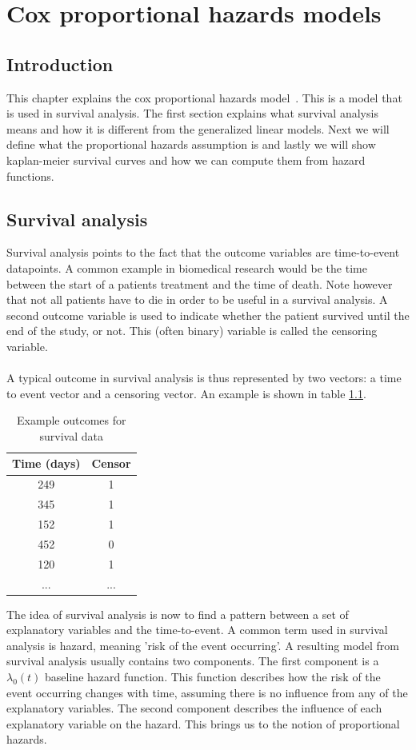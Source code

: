 \chapter{Cox proportional hazards models}
\label{cha:cox}

\section{Introduction}
\label{sec:cox-introduction}
This chapter explains the cox proportional hazards model~\cite{simon2011regularization}\cite{tibshirani1997lasso}\cite{wikicox}. This is a model that is used in survival analysis. The first section explains what survival analysis means and how it is different from the generalized linear models. Next we will define what the proportional hazards assumption is and lastly we will show kaplan-meier survival curves and how we can compute them from hazard functions.

\section{Survival analysis}
\label{sec:cox-survival-analysis}
Survival analysis points to the fact that the outcome variables are time-to-event datapoints. A common example in biomedical research would be the time between the start of a patients treatment and the time of death. Note however that not all patients have to die in order to be useful in a survival analysis. A second outcome variable is used to indicate whether the patient survived until the end of the study, or not. This (often binary) variable is called the censoring variable. \\ \\
A typical outcome in survival analysis is thus represented by two vectors: a time to event vector and a censoring vector. An example is shown in table \ref{tab:cox-example-outcome}.
\begin{table}
	\centering
	\begin{tabular}{cc}
		\toprule
		Time (days) & Censor\\
		\midrule
		249 & 1 \\
		345 & 1 \\
		152 & 1 \\
		452 & 0 \\
		120 & 1 \\
		... & ... \\
		\bottomrule
	\end{tabular}
	\caption{Example outcomes for survival data}
	\label{tab:cox-example-outcome}
\end{table}
The idea of survival analysis is now to find a pattern between a set of explanatory variables and the time-to-event. A common term used in survival analysis is hazard, meaning 'risk of the event occurring'. A resulting model from survival analysis usually contains two components. The first component is a $\lambda_{0}(t)$ baseline hazard function. This function describes how the risk of the event occurring changes with time, assuming there is no influence from any of the explanatory variables. The second component describes the influence of each explanatory variable on the hazard. This brings us to the notion of proportional hazards.

